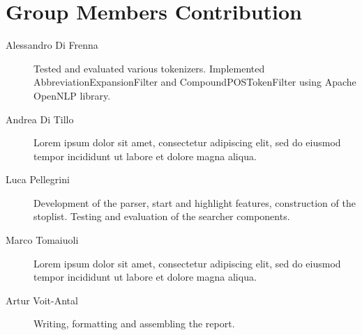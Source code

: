 \section{Group Members Contribution}


\begin{description}
	\item[Alessandro Di Frenna] Tested and evaluated various tokenizers. Implemented AbbreviationExpansionFilter and CompoundPOSTokenFilter using Apache OpenNLP library.
	\item[Andrea Di Tillo] Lorem ipsum dolor sit amet, consectetur adipiscing elit, sed do eiusmod tempor incididunt ut labore et dolore magna aliqua.
	\item[Luca Pellegrini] Development of the parser, start and highlight features, construction of the stoplist. Testing and evaluation of the searcher components.
	\item[Marco Tomaiuoli] Lorem ipsum dolor sit amet, consectetur adipiscing elit, sed do eiusmod tempor incididunt ut labore et dolore magna aliqua. 
	\item[Artur Voit-Antal] Writing, formatting and assembling the report. 

\end{description}
